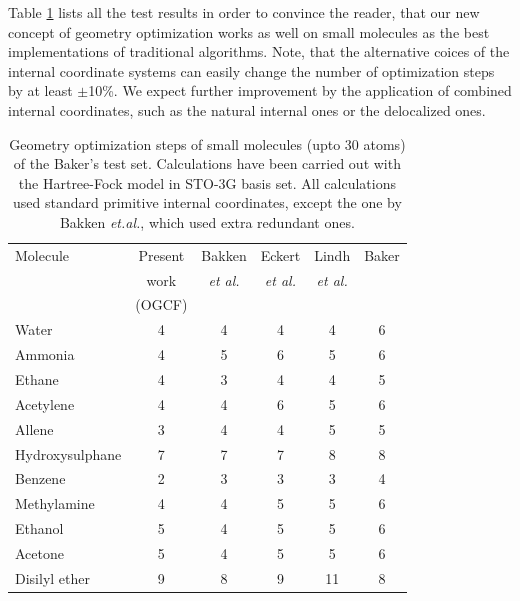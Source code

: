 \documentclass[prl,aps,twocolumn,showpacs,twocolumngrid,superbib]{revtex4}
\begin{document}
Table \ref{Bakers_test} lists all the test results
in order to convince
the reader, that our new concept of geometry optimization
works as well on small molecules as the best implementations
of traditional algorithms.
Note, that the alternative coices of the
internal coordinate systems can easily change the number
of optimization steps by at least $\pm$10\%.
We expect further improvement by the application of combined    
internal coordinates, such as the natural internal ones or the 
delocalized ones. 

\begin{table}[h]
\caption{
Geometry optimization steps of small molecules (upto 30 atoms)
of the Baker's test set. Calculations have been carried out 
with the Hartree-Fock model in STO-3G basis set.
All calculations used standard primitive internal coordinates,
except the one by Bakken {\it et.al.}, which used extra redundant
ones.
}
\label{Bakers_test}
\begin{tabular}{lccccc}
\toprule
Molecule               & Present  & Bakken & Eckert  & Lindh &  Baker  \\
         & work & {\it{et al.}} & {\it{et al.}} & {\it{et al.}} &    \\
         &(OGCF) &  \cite{bakken} &  \cite{eckert} & \cite{lindh} &  \cite{bakerstest} \\
\colrule
Water                  &   4    &   4    &    4    &    4   &   6     \\
Ammonia                &   4    &   5    &    6    &    5   &   6     \\
Ethane                 &   4    &   3    &    4    &    4   &   5     \\
Acetylene              &   4    &   4    &    6    &    5   &   6     \\
Allene                 &   3    &   4    &    4    &    5   &   5     \\
Hydroxysulphane        &   7    &   7    &    7    &    8   &   8     \\
Benzene                &   2    &   3    &    3    &    3   &   4     \\
Methylamine            &   4    &   4    &    5    &    5   &   6     \\
Ethanol                &   5    &   4    &    5    &    5   &   6     \\
Acetone                &   5    &   4    &    5    &    5   &   6     \\
Disilyl ether          &   9    &   8    &    9    &   11   &   8     \\

\end{tabular}
\end{table}
\end{document}

